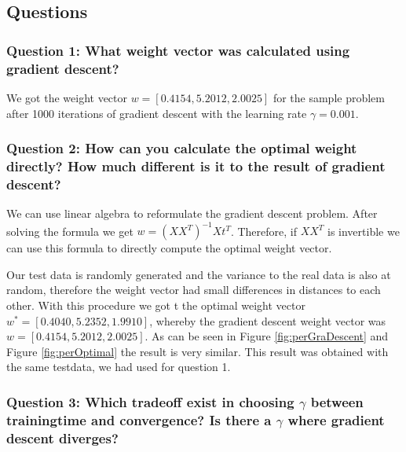 \subsection{Questions}

\subsubsection{Question 1: What weight vector was calculated using gradient descent?}

We got the weight vector $w = [0.4154, 5.2012, 2.0025]$ for the sample problem after 1000 iterations of gradient descent with the learning rate $\gamma = 0.001$.

\subsubsection{Question 2: How can you calculate the optimal weight directly? How much different is it to the result of gradient descent?}

We can use linear algebra to reformulate the gradient descent problem. After solving the formula we get $w = (XX^T)^{-1}Xt^T$. Therefore, if $XX^T$ is invertible we can use this formula to directly compute the optimal weight vector.

Our test data is randomly generated and the variance to the real data is also at random, therefore the weight vector had small differences in distances to each other. With this procedure we got t the optimal weight vector $w^* = [0.4040, 5.2352, 1.9910]$, whereby the gradient descent weight vector was $w = [0.4154, 5.2012, 2.0025]$. As can be seen in Figure \ref{fig:perGraDescent} and Figure \ref{fig:perOptimal} the result is very similar. This result was obtained with the same testdata, we had used for question 1. 

\subsubsection{Question 3: Which tradeoff exist in choosing $\gamma$ between trainingtime and convergence? Is there a $\gamma$ where gradient descent diverges?}


